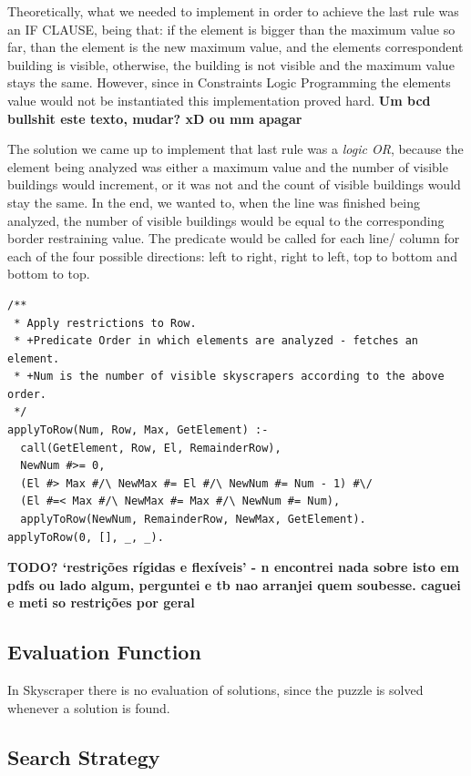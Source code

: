 \documentclass{llncs}
\begin{document}
Theoretically, what we needed to implement in order to achieve the last rule was an IF CLAUSE, being that: if the element is bigger than the maximum value so far, than the element is the new maximum value, and the elements correspondent building is visible, otherwise, the building is not visible and the maximum value stays the same. However, since in Constraints  Logic Programming the elements value would not be instantiated this implementation proved hard. \textbf{Um bcd bullshit este texto, mudar? xD ou mm apagar}

The solution we came up to implement that last rule was a \textit{logic OR}, because the element being analyzed was either a maximum value and the number of visible buildings would increment, or it was not and the count of visible buildings would stay the same. In the end, we wanted to, when the line was finished being analyzed, the number of visible buildings would be equal to the corresponding border restraining value. The predicate would be called for each line/ column for each of the four possible directions: left to right, right to left, top to bottom and bottom to top. 

\begin{lstlisting}[frame=tblr, caption=Constraint that assures correct number of visible buildings ]
/**
 * Apply restrictions to Row.
 * +Predicate Order in which elements are analyzed - fetches an element.
 * +Num is the number of visible skyscrapers according to the above order.
 */
applyToRow(Num, Row, Max, GetElement) :-
  call(GetElement, Row, El, RemainderRow),
  NewNum #>= 0,
  (El #> Max #/\ NewMax #= El #/\ NewNum #= Num - 1) #\/
  (El #=< Max #/\ NewMax #= Max #/\ NewNum #= Num),
  applyToRow(NewNum, RemainderRow, NewMax, GetElement).
applyToRow(0, [], _, _).
\end{lstlisting}

\textbf{TODO?  `restrições rígidas e flexíveis' - n encontrei nada sobre isto em pdfs ou lado algum, perguntei e tb nao arranjei quem soubesse. caguei e meti so restrições por geral}

%
\subsection{Evaluation Function}

In Skyscraper there is no evaluation of solutions, since the puzzle is solved whenever a solution is found.

%
\subsection{Search Strategy}
\end{document}
